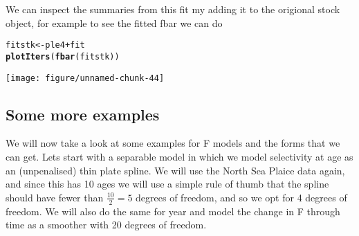 \documentclass[a4paper,english,10pt]{article}\usepackage[]{graphicx}\usepackage[]{color}
\makeatletter
\def\maxwidth{ %
  \ifdim\Gin@nat@width>\linewidth
    \linewidth
  \else
    \Gin@nat@width
  \fi
}
\newcommand{\hlopt}[1]{\textcolor[rgb]{0,0,0}{#1}}%
\newcommand{\hlstd}[1]{\textcolor[rgb]{0.345,0.345,0.345}{#1}}%
\newcommand{\hlkwb}[1]{\textcolor[rgb]{0.69,0.353,0.396}{#1}}%
\newcommand{\hlkwd}[1]{\textcolor[rgb]{0.737,0.353,0.396}{\textbf{#1}}}%
\newenvironment{kframe}{%
 \def\at@end@of@kframe{}%
 \ifinner\ifhmode%
  \def\at@end@of@kframe{\end{minipage}}%
  \begin{minipage}{\columnwidth}%
 \fi\fi%
 \def\FrameCommand##1{\hskip\@totalleftmargin \hskip-\fboxsep
 \colorbox{shadecolor}{##1}\hskip-\fboxsep
     \hskip-\linewidth \hskip-\@totalleftmargin \hskip\columnwidth}%
 \MakeFramed {\advance\hsize-\width
   \@totalleftmargin\z@ \linewidth\hsize
   \@setminipage}}%
 {\par\unskip\endMakeFramed%
 \at@end@of@kframe}
\newenvironment{knitrout}{}{} %
\makeatother
\begin{document}
We can inspect the summaries from this fit my adding it to the origional stock object, for example to see the fitted fbar we can do

\begin{knitrout}
\color{fgcolor}\begin{kframe}
\begin{alltt}
\hlstd{fitstk} \hlkwb{<-} \hlstd{ple4} \hlopt{+} \hlstd{fit}
\hlkwd{plotIters}\hlstd{(}\hlkwd{fbar}\hlstd{(fitstk))}
\end{alltt}
\end{kframe}
\texttt{[image: figure/unnamed-chunk-44]} 

\end{knitrout}



\subsection{Some more examples}

We will now take a look at some examples for F models and the forms that we can get.  Lets start with a separable model in which we model selectivity at age as an (unpenalised) thin plate spline.  We will use the North Sea Plaice data again, and since this has 10 ages we will use a simple rule of thumb that the spline should have fewer than $\frac{10}{2} = 5$ degrees of freedom, and so we opt for 4 degrees of freedom.  We will also do the same for year and model the change in F through time as a smoother with 20 degrees of freedom.
\end{document}
